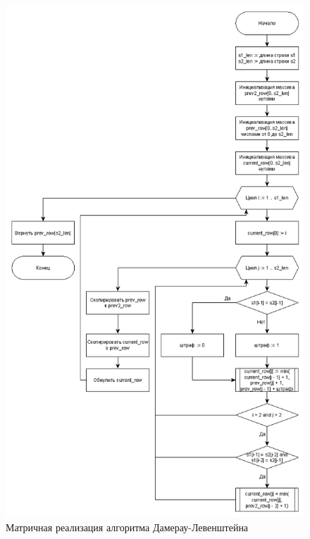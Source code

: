 \documentclass[12pt, a4paper]{report}
\begin{document}
	\begin{figure}[ht!]
		\centering
		\includegraphics[scale=0.5]{damleven}
		\caption{Матричная реализация алгоритма Дамерау-Левенштейна}
		\label{fig:damleven}
	\end{figure}
\end{document}
